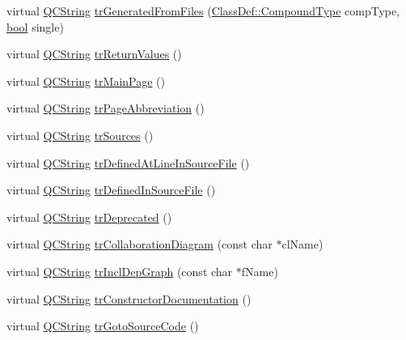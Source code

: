 \begin{DoxyCompactItemize}
\item 
virtual \hyperlink{class_q_c_string}{Q\+C\+String} \hyperlink{class_translator_norwegian_a96e08286372c9e3c8537de97355f1e00}{tr\+Generated\+From\+Files} (\hyperlink{class_class_def_ae70cf86d35fe954a94c566fbcfc87939}{Class\+Def\+::\+Compound\+Type} comp\+Type, \hyperlink{qglobal_8h_a1062901a7428fdd9c7f180f5e01ea056}{bool} single)
\item 
virtual \hyperlink{class_q_c_string}{Q\+C\+String} \hyperlink{class_translator_norwegian_a9b4ab20df4866fc01400711a887019c0}{tr\+Return\+Values} ()
\item 
virtual \hyperlink{class_q_c_string}{Q\+C\+String} \hyperlink{class_translator_norwegian_a5bd6c96821a9d80b2dc3c54ecf11e183}{tr\+Main\+Page} ()
\item 
virtual \hyperlink{class_q_c_string}{Q\+C\+String} \hyperlink{class_translator_norwegian_a4fca097c64f4c71f4b33495cf2e3530c}{tr\+Page\+Abbreviation} ()
\item 
virtual \hyperlink{class_q_c_string}{Q\+C\+String} \hyperlink{class_translator_norwegian_aff117baf6e8cbd1c6fadfe69baa3e1c1}{tr\+Sources} ()
\item 
virtual \hyperlink{class_q_c_string}{Q\+C\+String} \hyperlink{class_translator_norwegian_ac0f0e9c46cd36a15dfe3748e5d590a45}{tr\+Defined\+At\+Line\+In\+Source\+File} ()
\item 
virtual \hyperlink{class_q_c_string}{Q\+C\+String} \hyperlink{class_translator_norwegian_a54f951546cac0efff958fe6b16457e49}{tr\+Defined\+In\+Source\+File} ()
\item 
virtual \hyperlink{class_q_c_string}{Q\+C\+String} \hyperlink{class_translator_norwegian_af4da33e3e08ea884e7e25e69c09d1a0d}{tr\+Deprecated} ()
\item 
virtual \hyperlink{class_q_c_string}{Q\+C\+String} \hyperlink{class_translator_norwegian_ac40494d5e82232929951ef28b9c20aa5}{tr\+Collaboration\+Diagram} (const char $\ast$cl\+Name)
\item 
virtual \hyperlink{class_q_c_string}{Q\+C\+String} \hyperlink{class_translator_norwegian_a879742954ba446b8d26b7d2eced9b02a}{tr\+Incl\+Dep\+Graph} (const char $\ast$f\+Name)
\item 
virtual \hyperlink{class_q_c_string}{Q\+C\+String} \hyperlink{class_translator_norwegian_a69a708b9c415de38064383a2f190b305}{tr\+Constructor\+Documentation} ()
\item 
virtual \hyperlink{class_q_c_string}{Q\+C\+String} \hyperlink{class_translator_norwegian_aa58b3c26f941088fa8c5d1d8d1f90d01}{tr\+Goto\+Source\+Code} ()

\end{DoxyCompactItemize}
